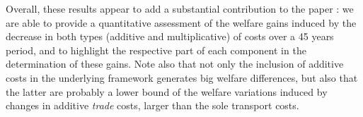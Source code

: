 \documentclass[a4paper,11pt]{article}
\begin{document}
Overall, these results appear to add a substantial contribution to the paper : we are able to provide a quantitative assessment of the welfare gains induced by the decrease in both types (additive and multiplicative) of costs over a 45 years period, and to highlight the respective part of each component in the determination of these gains. Note also that not only the inclusion of additive costs in the underlying framework generates big welfare differences, but also that the latter are probably a lower bound of the welfare variations induced by changes in additive \emph{trade} costs, larger than the sole transport costs.










\end{document}
